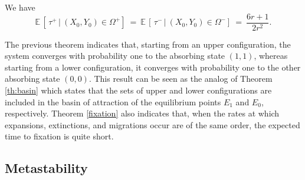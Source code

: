 \begin{theorem}
\label{fixation}
 We have
 $$ {\mathbb{E}} \,[\,\tau^+ \,| \ (X_0, Y_0) \in \Omega^+] \ = \
    {\mathbb{E}} \,[\,\tau^- \,| \ (X_0, Y_0) \in \Omega^-] \ = \ \frac{6r + 1}{2 r^2}. $$
\end{theorem}
 The previous theorem indicates that, starting from an upper configuration, the system converges with
 probability one to the absorbing state $(1, 1)$, whereas starting from a lower configuration, it converges
 with probability one to the other absorbing state $(0, 0)$.
 This result can be seen as the analog of Theorem \ref{th:basin} which states that the sets of upper and
 lower configurations are included in the basin of attraction of the equilibrium points $E_1$ and $E_0$, respectively.
 Theorem \ref{fixation} also indicates that, when the rates at which expansions, extinctions, and migrations
 occur are of the same order, the expected time to fixation is quite short.

\subsection{ Metastability}

